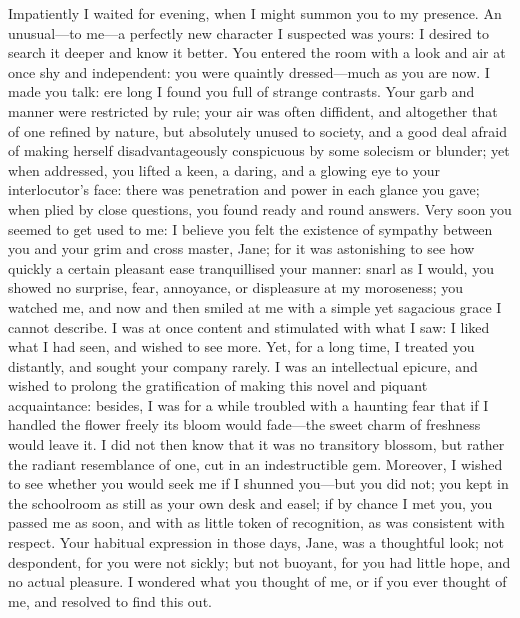 {%
Impatiently I waited for evening, when I might summon you to my
presence. An unusual---to me---a perfectly new character I suspected
was yours: I desired to search it deeper and know it better. You
entered the room with a look and air at once shy and independent: you
were quaintly dressed---much as you are now. I made you talk: ere long
I found you full of strange contrasts. Your garb and manner were
restricted by rule; your air was often diffident, and altogether that of
one refined by nature, but absolutely unused to society, and a good deal
afraid of making herself disadvantageously conspicuous by some solecism
or blunder; yet when addressed, you lifted a keen, a daring, and a
glowing eye to your interlocutor's face: there was penetration and power
in each glance you gave; when plied by close questions, you found ready
and round answers. Very soon you seemed to get used to me: I believe
you felt the existence of sympathy between you and your grim and cross
master, Jane; for it was astonishing to see how quickly a certain
pleasant ease tranquillised your manner: snarl as I would, you showed no
surprise, fear, annoyance, or displeasure at my moroseness; you watched
me, and now and then smiled at me with a simple yet sagacious grace I
cannot describe. I was at once content and stimulated with what I saw:
I liked what I had seen, and wished to see more. Yet, for a long time,
I treated you distantly, and sought your company rarely. I was an
intellectual epicure, and wished to prolong the gratification of making
this novel and piquant acquaintance: besides, I was for a while troubled
with a haunting fear that if I handled the flower freely its bloom would
fade---the sweet charm of freshness would leave it. I did not then know
that it was no transitory blossom, but rather the radiant resemblance of
one, cut in an indestructible gem. Moreover, I wished to see whether
you would seek me if I shunned you---but you did not; you kept in the
schoolroom as still as your own desk and easel; if by chance I met you,
you passed me as soon, and with as little token of recognition, as was
consistent with respect. Your habitual expression in those days, Jane,
was a thoughtful look; not despondent, for you were not sickly; but not
buoyant, for you had little hope, and no actual pleasure. I wondered
what you thought of me, or if you ever thought of me, and resolved to
find this out.

}
